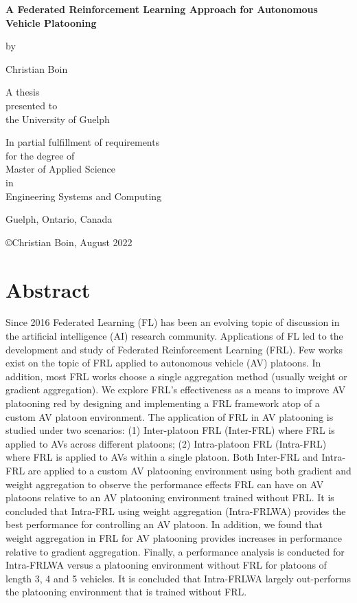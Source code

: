 \documentclass[oneside, 12pt]{book}
\begin{document}
\begin{titlepage}
	\setlength{\parskip}{12pt}
	\centering
	{\textbf{\LARGE A Federated Reinforcement Learning Approach for Autonomous Vehicle Platooning}\par}
	\vspace{1.5 cm}
	{by}\par
	\vspace{1 cm}
	{Christian Boin}\par
	\vspace{2cm}
	{A thesis\\
	presented to\\
	the University of Guelph}\par
	\vspace{2cm}
	{In partial fulfillment of requirements\\
	for the degree of\\
	Master of Applied Science\\
	in\\
	Engineering Systems and Computing}\par
	\vspace{2cm}
	{\normalsize Guelph, Ontario, Canada}\par
	\vspace{0.25cm}
	{\copyright\hspace{6pt}Christian Boin, August 2022}\par
\end{titlepage}

\chapter*{Abstract}
 Since 2016 Federated Learning (FL) has been an evolving topic of discussion in the artificial intelligence (AI) research community.  Applications of FL led to the development and study of Federated Reinforcement Learning (FRL).  Few works exist on the topic of FRL applied to autonomous vehicle (AV) platoons. In addition, most FRL works choose a single aggregation method (usually weight or gradient aggregation). We explore FRL's effectiveness as a means to improve AV platooning red by designing and implementing a FRL framework atop of a custom AV platoon environment.  The application of FRL in AV platooning is studied under two scenarios: (1)  Inter-platoon FRL (Inter-FRL) where FRL is applied to AVs across different platoons; (2) Intra-platoon FRL (Intra-FRL) where FRL is applied to AVs within a single platoon. Both Inter-FRL and Intra-FRL are applied to a custom AV platooning environment using both gradient and weight aggregation to observe the performance effects FRL can have on AV platoons relative to an AV platooning environment trained without FRL.  It is concluded that Intra-FRL using weight aggregation (Intra-FRLWA) provides the best performance for controlling an AV platoon. In addition, we found that weight aggregation in FRL for AV platooning provides increases in performance relative to gradient aggregation. Finally, a performance analysis is conducted for Intra-FRLWA versus a platooning environment without FRL for platoons of length 3, 4 and 5 vehicles. It is concluded that Intra-FRLWA largely out-performs the platooning environment that is trained without FRL.
\end{document}
